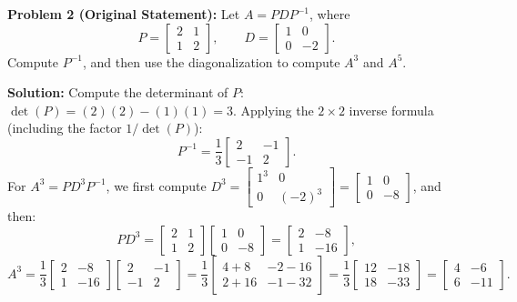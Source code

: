 \documentclass[11pt, letterpaper]{article}
\theoremstyle{definition}
\theoremstyle{remark}
\begin{document}
\vspace{0.8em}
\textbf{Problem 2 (Original Statement):}
Let $A = PDP^{-1}$, where
\[
P = \begin{bmatrix} 2 & 1 \\ 1 & 2 \end{bmatrix}, \qquad D = \begin{bmatrix} 1 & 0 \\ 0 & -2 \end{bmatrix}.
\]
Compute $P^{-1}$, and then use the diagonalization to compute $A^{3}$ and $A^{5}$.

\textbf{Solution:}
Compute the determinant of $P$: $\det(P) = (2)(2) - (1)(1) = 3$. Applying the $2 \times 2$ inverse formula (including the factor $1/\det(P)$):
\[
P^{-1} = \frac{1}{3}\begin{bmatrix} 2 & -1 \\ -1 & 2 \end{bmatrix}.
\]
For $A^{3} = PD^{3}P^{-1}$, we first compute $D^{3} = \begin{bmatrix} 1^{3} & 0 \\ 0 & (-2)^{3} \end{bmatrix} = \begin{bmatrix} 1 & 0 \\ 0 & -8 \end{bmatrix}$, and then:
\[
PD^{3} = \begin{bmatrix} 2 & 1 \\ 1 & 2 \end{bmatrix}\begin{bmatrix} 1 & 0 \\ 0 & -8 \end{bmatrix} = \begin{bmatrix} 2 & -8 \\ 1 & -16 \end{bmatrix},
\]
\[
A^{3} = \frac{1}{3}\begin{bmatrix} 2 & -8 \\ 1 & -16 \end{bmatrix}\begin{bmatrix} 2 & -1 \\ -1 & 2 \end{bmatrix} = \frac{1}{3}\begin{bmatrix} 4 + 8 & -2 - 16 \\ 2 + 16 & -1 - 32 \end{bmatrix} = \frac{1}{3}\begin{bmatrix} 12 & -18 \\ 18 & -33 \end{bmatrix} = \begin{bmatrix} 4 & -6 \\ 6 & -11 \end{bmatrix}.
\]
\end{document}
